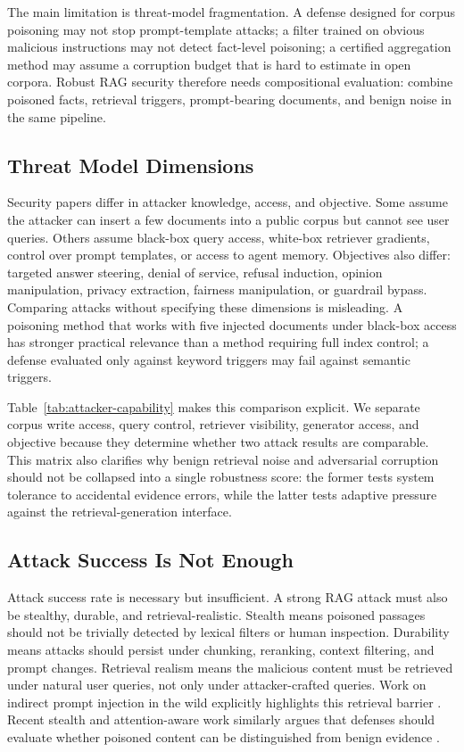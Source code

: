 \documentclass[11pt]{article}
\begin{document}
The main limitation is threat-model fragmentation. A defense designed for corpus poisoning may not stop prompt-template attacks; a filter trained on obvious malicious instructions may not detect fact-level poisoning; a certified aggregation method may assume a corruption budget that is hard to estimate in open corpora. Robust RAG security therefore needs compositional evaluation: combine poisoned facts, retrieval triggers, prompt-bearing documents, and benign noise in the same pipeline.

\subsection{Threat Model Dimensions}

Security papers differ in attacker knowledge, access, and objective. Some assume the attacker can insert a few documents into a public corpus but cannot see user queries. Others assume black-box query access, white-box retriever gradients, control over prompt templates, or access to agent memory. Objectives also differ: targeted answer steering, denial of service, refusal induction, opinion manipulation, privacy extraction, fairness manipulation, or guardrail bypass. Comparing attacks without specifying these dimensions is misleading. A poisoning method that works with five injected documents under black-box access has stronger practical relevance than a method requiring full index control; a defense evaluated only against keyword triggers may fail against semantic triggers.

Table~\ref{tab:attacker-capability} makes this comparison explicit. We separate corpus write access, query control, retriever visibility, generator access, and objective because they determine whether two attack results are comparable. This matrix also clarifies why benign retrieval noise and adversarial corruption should not be collapsed into a single robustness score: the former tests system tolerance to accidental evidence errors, while the latter tests adaptive pressure against the retrieval-generation interface.

\subsection{Attack Success Is Not Enough}

Attack success rate is necessary but insufficient. A strong RAG attack must also be stealthy, durable, and retrieval-realistic. Stealth means poisoned passages should not be trivially detected by lexical filters or human inspection. Durability means attacks should persist under chunking, reranking, context filtering, and prompt changes. Retrieval realism means the malicious content must be retrieved under natural user queries, not only under attacker-crafted queries. Work on indirect prompt injection in the wild explicitly highlights this retrieval barrier \citep{rrag005}. Recent stealth and attention-aware work similarly argues that defenses should evaluate whether poisoned content can be distinguished from benign evidence \citep{rrag015}.
\end{document}
